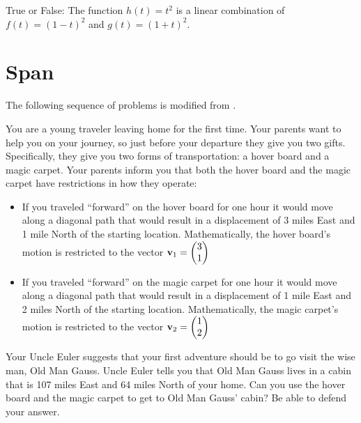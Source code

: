 \begin{problem}
    True or False: The function $h(t) = t^2$ is a linear combination of $f(t) = (1-t)^2$
    and $g(t) = (1+t)^2$.
\end{problem}
% 
%             


\newpage\section{Span}
The following sequence of problems is modified from \cite{carpet}.
\begin{problem}
    You are a young traveler leaving home for the first time.  Your parents want to help
    you on your journey, so just before your departure they give you two gifts.
    Specifically, they give you two forms of transportation: a hover board and a magic
    carpet.  Your parents inform you that both the hover board and the magic carpet have
    restrictions in how they operate:
    \begin{itemize}
        \item If you traveled ``forward'' on the hover board for one hour it would move along a
            diagonal path that would result in a displacement of 3 miles East and 1 mile
            North of the starting location.  Mathematically, the hover board's motion is
            restricted to the vector ${\bf v}_1 = \begin{pmatrix} 3\\1\end{pmatrix}$
        \item If you traveled ``forward'' on the magic carpet for one hour it would move along a
            diagonal path that would result in a displacement of 1 mile East and 2 miles
            North of the starting location.  Mathematically, the magic carpet's motion is
            restricted to the vector ${\bf v}_2 = \begin{pmatrix} 1\\2\end{pmatrix}$
    \end{itemize}
    Your Uncle Euler suggests that your first adventure should be to go visit the wise
    man, Old Man Gauss.  Uncle Euler tells you that Old Man Gauss lives in a cabin that is
    107 miles East and 64 miles North of your home.  Can you use the hover board and the
    magic carpet to get to Old Man Gauss' cabin?  Be able to defend your answer.
\end{problem}

